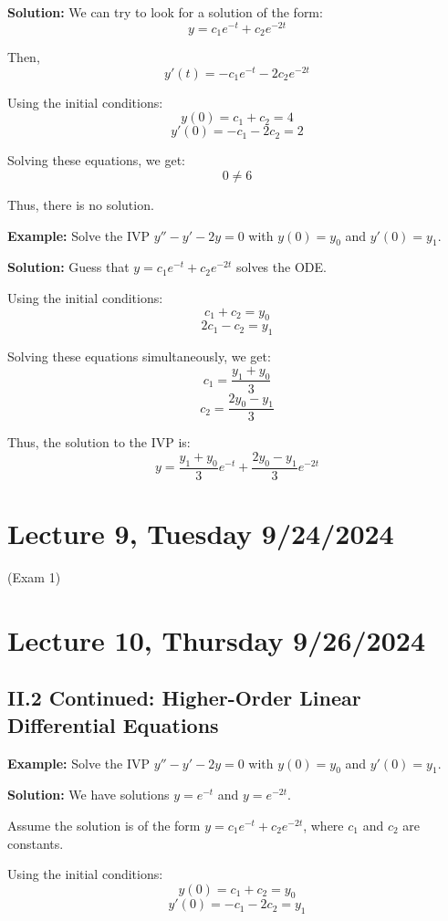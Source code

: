 \documentclass{article}
\begin{document}
\textbf{Solution:} We can try to look for a solution of the form:
\[
y = c_1 e^{-t} + c_2 e^{-2t}
\]

Then,
\[
y'(t) = -c_1 e^{-t} - 2c_2 e^{-2t}
\]

Using the initial conditions:
\[
y(0) = c_1 + c_2 = 4
\]
\[
y'(0) = -c_1 - 2c_2 = 2
\]

Solving these equations, we get:
\[
0 \neq 6
\]

Thus, there is no solution.

\textbf{Example:} Solve the IVP \( y'' - y' - 2y = 0 \) with \( y(0) = y_0 \) and \( y'(0) = y_1 \).

\textbf{Solution:} Guess that \( y = c_1 e^{-t} + c_2 e^{-2t} \) solves the ODE.

Using the initial conditions:
\[
 c_1 + c_2 = y_0
\]
\[
2c_1 - c_2 = y_1
\]

Solving these equations simultaneously, we get:
\[
c_1 = \frac{y_1 + y_0}{3}
\]
\[
c_2 = \frac{2y_0 - y_1}{3}
\]

Thus, the solution to the IVP is:
\[
y = \frac{y_1 + y_0}{3} e^{-t} + \frac{2y_0 - y_1}{3} e^{-2t}
\]

\pagebreak

\section*{Lecture 9, Tuesday 9/24/2024}

(Exam 1)

\pagebreak

\section*{Lecture 10, Thursday 9/26/2024}

\subsection*{II.2 Continued: Higher-Order Linear Differential Equations}

\textbf{Example:} Solve the IVP \( y'' - y' - 2y = 0 \) with \( y(0) = y_0 \) and \( y'(0) = y_1 \).

\textbf{Solution:} We have solutions \( y = e^{-t} \) and \( y = e^{-2t} \).

Assume the solution is of the form \( y = c_1 e^{-t} + c_2 e^{-2t} \), where \( c_1 \) and \( c_2 \) are constants.

Using the initial conditions:
\[
y(0) = c_1 + c_2 = y_0
\]
\[
y'(0) = -c_1 - 2c_2 = y_1
\]
\end{document}
